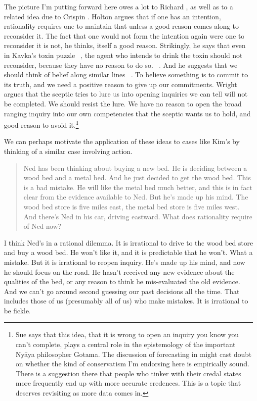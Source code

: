 The picture I'm putting forward here owes a lot to Richard  \citet{Holton1999, Holton2009, Holton2014}, as well as to a related idea due to Crispin  \citet{Wright2004}. Holton argues that if one has an intention, rationality requires one to maintain that unless a good reason comes along to reconsider it. The fact that one would not form the intention again were one to reconsider it is not, he thinks, itself a good reason. Strikingly, he says that even in Kavka's toxin puzzle ~\citep{Kavka1983}, the agent who intends to drink the toxin should not reconsider, because they have no reason to do so. ~\citep[162--5]{Holton2009}. And he suggests that we should think of belief along similar lines ~\citep{Holton2014}. To believe something is to commit to its truth, and we need a positive reason to give up our commitments. Wright argues that the sceptic tries to lure us into opening inquiries we can tell will not be completed. We should resist the lure. We have no reason to open the broad ranging inquiry into our own competencies that the sceptic wants us to hold, and good reason to avoid it.\footnote{Sue  \citet[78]{Hamilton2001} says that this idea, that it is wrong to open an inquiry you know you can't complete, plays a central role in the epistemology of the important Nyāya philosopher Gotama. The discussion of forecasting in  \citet{Tetlock2015} might cast doubt on whether the kind of conservatism I'm endorsing here is empirically sound. There is a suggestion there that people who tinker with their credal states more frequently end up with more accurate credences. This is a topic that deserves revisiting as more data comes in.}

We can perhaps motivate the application of these ideas to cases like Kim's by thinking of a similar case involving action. 

\begin{quote}

Ned has been thinking about buying a new bed. He is deciding between a wood bed and a metal bed. And he just decided to get the wood bed. This is a bad mistake. He will like the metal bed much better, and this is in fact clear from the evidence available to Ned. But he's made up his mind. The wood bed store is five miles east, the metal bed store is five miles west. And there's Ned in his car, driving eastward. What does rationality require of Ned now?
\end{quote}
I think Ned's in a rational dilemma. It is irrational to drive to the wood bed store and buy a wood bed. He won't like it, and it is predictable that he won't. What a mistake. But it is irrational to reopen inquiry. He's made up his mind, and now he should focus on the road. He hasn't received any new evidence about the qualities of the bed, or any reason to think he mis-evaluated the old evidence. And we can't go around second guessing our past decisions all the time. That includes those of us (presumably all of us) who make mistakes. It is irrational to be fickle. 

